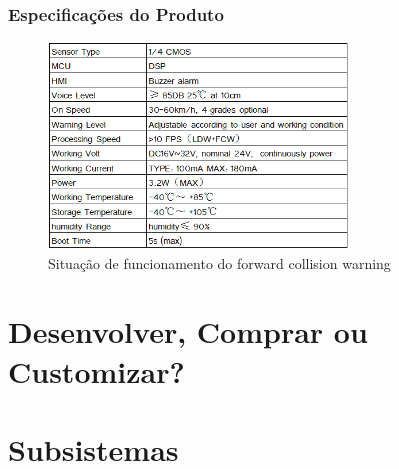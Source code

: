 \subsubsection{Especificações do Produto}

\begin{figure}[h]
  \centering
  \includegraphics[width=300px, scale=0.5]{figuras/especificacaiForwardCollision}
  \caption{Situação de funcionamento do forward collision warning}
  \label{table:especificacaiForwardCollision}
\end{figure}

\section{Desenvolver, Comprar ou Customizar?}

\section{Subsistemas}
